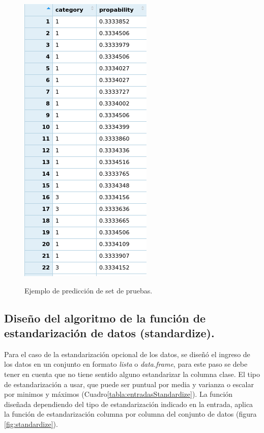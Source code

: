 \begin{figure}[h!]
	\caption{Ejemplo de predicción de set de pruebas.}
	\centering
	\includegraphics[scale=0.8]{outputTesting.png}
	\label{fig:outputTesting}
\end{figure}

\subsection{Diseño del algoritmo de la función de estandarización de datos (standardize).}

	Para el caso de la estandarización opcional de los datos, se diseñó el ingreso de los datos en un conjunto en formato \textit{lista} o \textit{data.frame}, para este paso se debe tener en cuenta que no tiene sentido alguno estandarizar la columna clase. El tipo de estandarización a usar, que puede ser puntual por media y varianza o escalar por minimos y máximos (Cuadro\ref{tabla:entradasStandardize}). La función diseñada dependiendo del tipo de estandarización indicado en la entrada, aplica la función de estandarización columna por columna del conjunto de datos (figura \ref{fig:standardize}).\\
	

